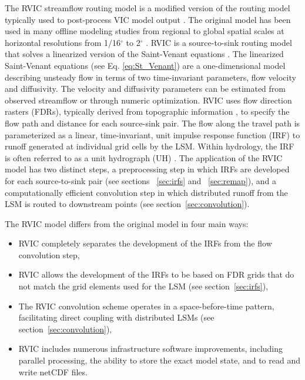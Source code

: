 The RVIC streamflow routing model is a modified version of the routing model typically used to post-process VIC model output \citep{Lohmann_1996, Lohmann_1998a}.
The original \citet{Lohmann_1996} model has been used in many offline modeling studies from regional to global spatial scales at horizontal resolutions from 1/16$^{\circ}$ to 2$^{\circ}$ \citep[e.g.][]{Nijssen_1997,Lohmann_1998b,Su_2005,Hamlet_2013}.
RVIC is a source-to-sink routing model that solves a linearized version of the Saint-Venant equations \citep{Fread_1992,Mesa_1986}.
The linearized Saint-Venant equations (see Eq. \ref{eq:St_Venant}) are a one-dimensional model describing unsteady flow in terms of two time-invariant parameters, flow velocity and diffusivity.
The velocity and diffusivity parameters can be estimated from observed streamflow or through numeric optimization.
RVIC uses flow direction rasters (FDRs), typically derived from topographic information \citep[e.g.][]{Wu_2011}, to specify the flow path and distance for each source-sink pair.
The flow along the travel path is parameterized as a linear, time-invariant, unit impulse response function (IRF) to runoff generated at individual grid cells by the LSM.
Within hydrology, the IRF is often referred to as a unit hydrograph (UH) \citep[e.g.][]{Sherman_1932,Nash_1957}.
The application of the RVIC model has two distinct steps, a preprocessing step in which IRFs are developed for each source-to-sink pair (see sections ~\ref{sec:irfs} and ~\ref{sec:remap}), and a computationally efficient convolution step in which distributed runoff from the LSM is routed to downstream points (see section~\ref{sec:convolution}).

The RVIC model differs from the original \citet{Lohmann_1996} model in four main ways:

\begin{itemize}
\item RVIC completely separates the development of the IRFs from the flow convolution step,
\item RVIC allows the development of the IRFs to be based on FDR grids that do not match the grid elements used for the LSM (see section~\ref{sec:irfs}),
\item The RVIC convolution scheme operates in a space-before-time pattern, facilitating direct coupling with distributed LSMs (see section~\ref{sec:convolution}),
\item RVIC includes numerous infrastructure software improvements, including parallel processing, the ability to store the exact model state, and to read and write netCDF files.
\end{itemize}

